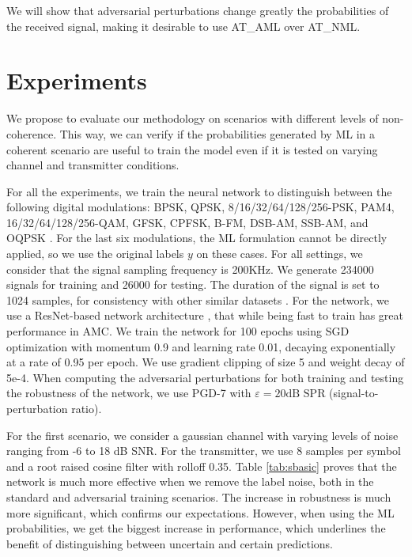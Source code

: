 \documentclass[conference]{IEEEtran}
\begin{document}
We will show that adversarial perturbations change greatly the probabilities of the received signal, making it desirable to use AT\_AML over AT\_NML.


\section{Experiments}

We propose to evaluate our methodology on scenarios with different levels of non-coherence. This way, we can verify if the probabilities generated by ML in a coherent scenario are useful to train the model even if it is tested on varying channel and transmitter conditions. 

For all the experiments, we train the neural network to distinguish between the following digital modulations: BPSK, QPSK, 8/16/32/64/128/256-PSK, PAM4, 16/32/64/128/256-QAM, GFSK, CPFSK, B-FM, DSB-AM, SSB-AM, and OQPSK \cite{Rajendran_Meert_Giustiniano_Lenders_Pollin_2018,Guo_Jiang_Wu_Zhou_2020}. For the last six modulations, the ML formulation cannot be directly applied, so we use the original labels $y$ on these cases.
For all settings, we consider that the signal sampling frequency is 200KHz. We generate 234000 signals for training and 26000 for testing. The duration of the signal is set to 1024 samples, for consistency with other similar datasets \cite{OShea_West_2016}. For the network, we use a ResNet-based network architecture \cite{OShea_Roy_Clancy_2018}, that while being fast to train has great performance in AMC. We train the network for 100 epochs using SGD optimization with momentum 0.9 and learning rate 0.01, decaying exponentially at a rate of 0.95 per epoch. We use gradient clipping of size 5 and weight decay of 5e-4. When computing the adversarial perturbations for both training and testing the robustness of the network, we use PGD-7 with $\varepsilon=20 \text{dB SPR}$ (signal-to-perturbation ratio).

For the first scenario, we consider a gaussian channel with varying levels of noise ranging from -6 to 18 dB SNR. For the transmitter, we use 8 samples per symbol and a root raised cosine filter with rolloff 0.35. Table \ref{tab:sbasic} proves that the network is much more effective when we remove the label noise, both in the standard and adversarial training scenarios. The increase in robustness is much more significant, which confirms our expectations. However, when using the ML probabilities, we get the biggest increase in performance, which underlines the benefit of distinguishing between uncertain and certain predictions.
\end{document}
